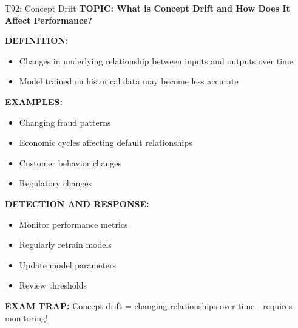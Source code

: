 \documentclass[8pt]{beamer}
\begin{document}
	\begin{frame}{T92: Concept Drift}
		\fontsize{6.5}{7.5}\selectfont
		\textbf{TOPIC: What is Concept Drift and How Does It Affect Performance?}
		
		\vspace{0.1cm}
		\textbf{DEFINITION:}
		\begin{itemize}
			\item Changes in underlying relationship between inputs and outputs over time
			\item Model trained on historical data may become less accurate
		\end{itemize}
		
		\vspace{0.1cm}
		\textbf{EXAMPLES:}
		\begin{itemize}
			\item Changing fraud patterns
			\item Economic cycles affecting default relationships
			\item Customer behavior changes
			\item Regulatory changes
		\end{itemize}
		
		\vspace{0.1cm}
		\textbf{DETECTION AND RESPONSE:}
		\begin{itemize}
			\item Monitor performance metrics
			\item Regularly retrain models
			\item Update model parameters
			\item Review thresholds
		\end{itemize}
		
		\textcolor{myred}{\textbf{EXAM TRAP:}} Concept drift = \textcolor{myblue}{changing relationships} over time - requires monitoring!
	\end{frame}
	
\end{document}
